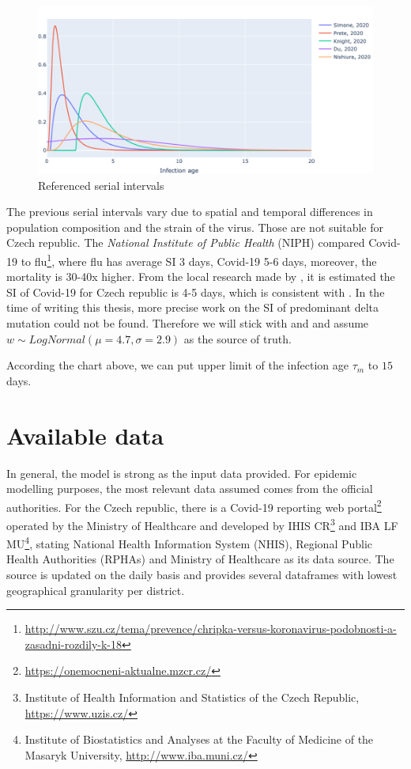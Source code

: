 \documentclass[
  digital, %
  oneside, %
  lof,     %
  lot,     %
]{fithesis4}
\begin{document}
\begin{figure}[h]
  \begin{center}
    \includegraphics[width=\textwidth]{images/serial-intervals-overview.png}
  \end{center}
  \caption{Referenced serial intervals}
  \label{fig:serial-intervals-overview}
\end{figure}

The previous serial intervals vary due to spatial and 
temporal differences in population composition and the
strain of the virus.
Those are not suitable for Czech republic. 
The \textit{National Institute of Public Health} (NIPH)  
compared Covid-19 to flu\footnote{\url{http://www.szu.cz/tema/prevence/chripka-versus-koronavirus-podobnosti-a-zasadni-rozdily-k-18}}, 
where flu has average SI 3 days, 
Covid-19 5-6 days, moreover, the mortality is 30-40x higher.
From the local research made by \cite{majek2020}, 
it is estimated the SI of Covid-19 for Czech republic is 4-5 days, which is 
consistent with \cite{nishiura2020}. 
In the time of writing this thesis, more precise work on the 
SI of predominant delta mutation could not be found. 
Therefore we will stick with \cite{majek2020} and 
\cite{nishiura2020} and assume 
$w \sim LogNormal \left( \mu = 4.7, \sigma = 2.9 \right)$ 
as the source of truth. 

According the chart above, we can put upper limit of the 
infection age $\tau_m$ to $15$ days.

\section{Available data}

In general, the model is strong as the input data provided.
For epidemic modelling purposes, the most relevant data 
assumed comes from the official authorities.
For the Czech republic, there is a Covid-19 reporting web 
portal\footnote{\url{https://onemocneni-aktualne.mzcr.cz/}} operated 
by the Ministry of Healthcare and developed by IHIS CR\footnote{Institute of Health Information and Statistics of the Czech Republic, \url{https://www.uzis.cz/}} 
and IBA LF MU\footnote{Institute of Biostatistics and Analyses at the Faculty of Medicine of the Masaryk University, \url{http://www.iba.muni.cz/}}, 
stating National Health Information System (NHIS), Regional Public 
Health Authorities (RPHAs) and Ministry of Healthcare as its 
data source. 
The source is updated on the daily basis and provides several 
dataframes with lowest geographical granularity per district.
\end{document}
